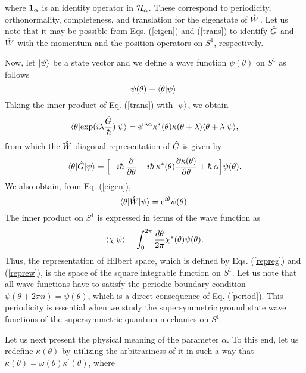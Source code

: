 \documentclass[a4paper,12pt]{article}
\begin{document}
where ${\bf 1}_{\alpha}$ is an identity operator in ${\cal H}_{\alpha}$.
These correspond to periodicity, orthonormality, completeness, and 
translation for the eigenstate of $\hat W$. Let us note that 
it may be possible from Eqs. (\ref{eigen}) and (\ref{trans}) to 
identify $\hat G$ and $\hat W$ with the momentum and 
the position operators on $S^1$, respectively. 
\par
Now, let $|{\psi}\rangle$ be a state vector and we define a wave function
$\psi(\theta)$ on $S^1$ as follows
\begin{equation}
\psi(\theta)\equiv \langle{\theta}|{\psi}\rangle.
\end{equation}
Taking the inner product of Eq. (\ref{trans}) with $|{\psi}\rangle$, we obtain
\begin{equation}
\bra{\theta}{\rm exp}(i\lambda{\hg\over\hbar})\ket{\psi}
=\e^{i\lambda\alpha}\kappa^*(\theta)\kappa(\theta+\lambda)
\norm{\theta+\lambda}{\psi}, 
\end{equation}
from which the $\hat W$-diagonal representation of $\hat G$ is given by
\begin{equation}
\bra{\theta}{\hg}\ket{\psi}=
\Bigl[-i\hbar~{\del\over{\del\theta}}-i\hbar~\kappa^*(\theta)
{{\del\kappa(\theta)}\over {\del\theta}}+\hbar~\alpha\Bigr]\psi(\theta).
\label{repreg}
\end{equation}
We also obtain, from Eq. (\ref{eigen}),
\begin{equation}
\langle {\theta}|{\hat W}|{\psi}\rangle={\rm e}^{i\theta}\psi(\theta).
\label{reprew}
\end{equation}
The inner product on $S^1$ is expressed in terms 
of the wave function as
\begin{equation}
\langle{\chi}|{\psi}\rangle=\int_0^{2\pi}{{d\theta}\over {2\pi}}
\chi^*(\theta)\psi(\theta).
\end{equation} 
Thus, the representation of Hilbert space, which is defined by
Eqs. (\ref{repreg}) and (\ref{reprew}), is the space of the square integrable 
function on $S^1$. Let us note that all wave functions 
have to satisfy the periodic boundary condition $\psi(\theta+2\pi n)
=\psi(\theta)$, which is a direct consequence of Eq. (\ref{period}). 
This periodicity is essential when we study the supersymmetric ground state
wave functions of the supersymmetric quantum mechanics on $S^1$.
\par
Let us next present the physical meaning of the parameter $\alpha$. 
To this end, let us redefine $\kappa(\theta)$ 
by utilizing the arbitrariness of it in 
such a way that $\kappa(\theta)=\omega(\theta)\kappa^{\prime}(\theta)$, where 
\end{document}
